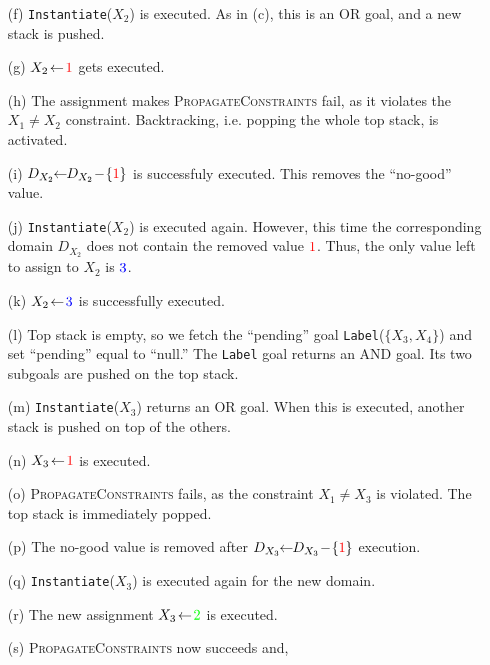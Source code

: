\documentclass{ws-ijait}
\begin{document}
\begin{enumerate}
  \item[(f)] \texttt{Instantiate}($X_2$) is executed. As in
             (c), this is an \textsc{OR} goal, and a new
             stack is pushed.
  \item[(g)] $X_2 \! \gets \! \textcolor{red}{1}$ gets
             executed.
  \item[(h)] The assignment makes
             \textsc{PropagateConstraints} fail, as it
             violates the $X_1 \neq X_2$ constraint.
             Backtracking, i.e. popping the whole top stack,
             is activated.
  \item[(i)] $D_{X_2} \!\! \gets \!\! D_{X_2} \! - \!
             \{\textcolor{red}{1}\}$ is successfuly
             executed. This removes the ``no-good'' value.
  \item[(j)] \texttt{Instantiate}($X_2$) is executed again.
             However, this time the corresponding domain
             $D_{X_2}$ does not contain the removed value
             $\textcolor{red}{1}$. Thus, the only value left
             to assign to $X_2$ is $\textcolor{blue}{3}$.
  \item[(k)] $X_2 \! \gets \! \textcolor{blue}{3}$ is
             successfully executed.
  \item[(l)] Top stack is empty, so we fetch the ``pending''
             goal \texttt{Label}($\{X_3, X_4\}$) and set
             ``pending'' equal to ``null.'' The
             \texttt{Label} goal returns an \textsf{AND}
             goal. Its two subgoals are pushed on the top
             stack.
  \item[(m)] \texttt{Instantiate}($X_3$) returns an
             \textsf{OR} goal. When this is executed,
             another stack is pushed on top of the others.
  \item[(n)] $X_3 \! \gets \! \textcolor{red}{1}$ is
             executed.
  \item[(o)] \textsc{PropagateConstraints} fails, as the
             constraint $X_1 \neq X_3$ is violated. The top
             stack is immediately popped.
  \item[(p)] The no-good value is removed after $D_{X_3}
             \!\! \gets \!\! D_{X_3} \! - \!
             \{\textcolor{red}{1}\}$ execution.
  \item[(q)] \texttt{Instantiate}($X_3$) is executed again
             for the new domain.
  \item[(r)] The new assignment $X_3 \! \gets \!
             \textcolor{green}{2}$ is executed.
  \item[(s)] \textsc{PropagateConstraints} now succeeds and,

\end{enumerate}
\end{document}
